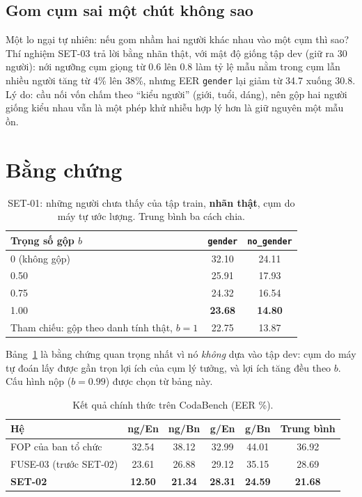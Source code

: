 \documentclass[11pt,a4paper]{article}
\begin{document}
\subsection{Gom cụm sai một chút không sao}
Một lo ngại tự nhiên: nếu gom nhầm hai người khác nhau vào một cụm thì sao? Thí nghiệm SET-03 trả lời bằng nhãn thật, với mật độ giống tập dev (giữ ra 30 người): nới ngưỡng cụm giọng từ 0.6 lên 0.8 làm tỷ lệ mẫu nằm trong cụm lẫn nhiều người tăng từ 4\% lên 38\%, nhưng EER \texttt{gender} lại giảm từ 34.7 xuống 30.8. Lý do: cầu nối vốn chấm theo ``kiểu người'' (giới, tuổi, dáng), nên gộp hai người giống kiểu nhau vẫn là một phép khử nhiễu hợp lý hơn là giữ nguyên một mẫu ồn.

\section{Bằng chứng}

\begin{table}[h]
\centering
\caption{SET-01: những người chưa thấy của tập train, \textbf{nhãn thật}, cụm do máy tự ước lượng. Trung bình ba cách chia.}
\label{tab:set01}
\begin{tabular}{lcc}
\toprule
Trọng số gộp $b$ & \texttt{gender} & \texttt{no\_gender} \\
\midrule
0 (không gộp) & 32.10 & 24.11 \\
0.50 & 25.91 & 17.93 \\
0.75 & 24.32 & 16.54 \\
1.00 & \textbf{23.68} & \textbf{14.80} \\
\midrule
\multicolumn{1}{l}{\color{muted}Tham chiếu: gộp theo danh tính thật, $b=1$} & \color{muted}22.75 & \color{muted}13.87 \\
\bottomrule
\end{tabular}
\end{table}

Bảng~\ref{tab:set01} là bằng chứng quan trọng nhất vì nó \emph{không} dựa vào tập dev: cụm do máy tự đoán lấy được gần trọn lợi ích của cụm lý tưởng, và lợi ích tăng đều theo $b$. Cấu hình nộp ($b=0.99$) được chọn từ bảng này.

\begin{table}[h]
\centering
\caption{Kết quả chính thức trên CodaBench (EER \%).}
\label{tab:cb}
\begin{tabular}{lccccc}
\toprule
Hệ & ng/En & ng/Bn & g/En & g/Bn & Trung bình \\
\midrule
FOP của ban tổ chức & 32.54 & 38.12 & 32.99 & 44.01 & 36.92 \\
FUSE-03 (trước SET-02) & 23.61 & 26.88 & 29.12 & 35.15 & 28.69 \\
\textbf{SET-02} & \textbf{12.50} & \textbf{21.34} & \textbf{28.31} & \textbf{24.59} & \textbf{21.68} \\
\bottomrule
\end{tabular}
\end{table}
\end{document}
